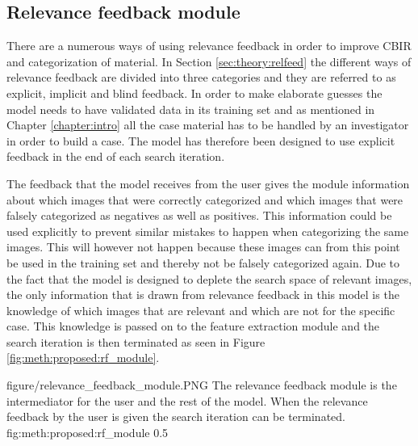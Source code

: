 
\subsection{Relevance feedback module}
\label{sec:method:proposed:rf}
There are a numerous ways of using relevance feedback in order to improve CBIR and categorization of material. In Section \ref{sec:theory:relfeed} the different ways of relevance feedback are divided into three categories and they are referred to as explicit, implicit and blind feedback. 
In order to make elaborate guesses the model needs to have validated data in its training set and as mentioned in Chapter \ref{chapter:intro} all the case material has to be handled by an investigator in order to build a case. The model has therefore been designed to use explicit feedback in the end of each search iteration.

The feedback that the model receives from the user gives the module information about which images that were correctly categorized and which images that were falsely categorized as negatives as well as positives. This information could be used explicitly to prevent similar mistakes to happen when categorizing the same images. This will however not happen because these images can from this point be used in the training set and  thereby not be falsely categorized again. Due to the fact that the model is designed to deplete the search space of relevant images, the only information that is drawn from relevance feedback in this model is the knowledge of which images that are relevant and which are not for the specific case. This knowledge is passed on to the feature extraction module and the search iteration is then terminated as seen in Figure \ref{fig:meth:proposed:rf_module}.

\singlefigurenear
{figure/relevance_feedback_module.PNG}
{The relevance feedback module is the intermediator for the user and the rest of the model. When the relevance feedback by the user is given the search iteration can be terminated.}
{fig:meth:proposed:rf_module}
{0.5}

